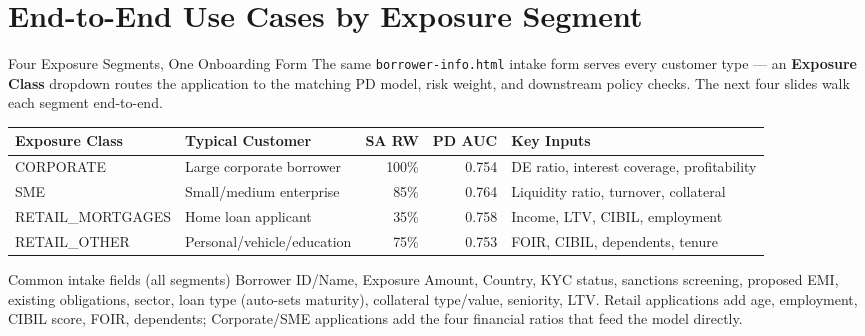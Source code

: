 \documentclass[9pt,aspectratio=169]{beamer}
\begin{document}
\section{End-to-End Use Cases by Exposure Segment}

\begin{frame}{Four Exposure Segments, One Onboarding Form}
\vspace{-2pt}
{\footnotesize The same \texttt{borrower-info.html} intake form serves every customer type ---
an \textbf{Exposure Class} dropdown routes the application to the matching PD model, risk weight,
and downstream policy checks. The next four slides walk each segment end-to-end.}\\[8pt]
\begin{center}
\footnotesize
\begin{tabular}{lp{2.9cm}rrp{4.0cm}}
  \toprule
  \textbf{Exposure Class} & \textbf{Typical Customer} & \textbf{SA RW} & \textbf{PD AUC} & \textbf{Key Inputs}\\
  \midrule
  CORPORATE          & Large corporate borrower   & 100\% & 0.754 & DE ratio, interest coverage, profitability\\
  SME                & Small/medium enterprise    & 85\%  & 0.764 & Liquidity ratio, turnover, collateral\\
  RETAIL\_MORTGAGES  & Home loan applicant        & 35\%  & 0.758 & Income, LTV, CIBIL, employment\\
  RETAIL\_OTHER      & Personal/vehicle/education & 75\%  & 0.753 & FOIR, CIBIL, dependents, tenure\\
  \bottomrule
\end{tabular}
\end{center}
\vspace{8pt}
\begin{block}{Common intake fields (all segments)}
  \footnotesize
  Borrower ID/Name, Exposure Amount, Country, KYC status, sanctions screening, proposed EMI,
  existing obligations, sector, loan type (auto-sets maturity), collateral type/value,
  seniority, LTV. Retail applications add age, employment, CIBIL score, FOIR, dependents; Corporate/SME
  applications add the four financial ratios that feed the model directly.
\end{block}
\end{frame}
\end{document}
